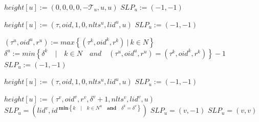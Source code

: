 \begin{algorithm}
	\caption{$ELECTSELF$}
	\begin{algorithmic}[1]
		\State $height[u] := (0,0,0,0,-\mathcal{T}_u ,u,u)$
		\State $SLP_u := (-1, -1)$
	\end{algorithmic}
\end{algorithm}

\begin{algorithm}
	\caption{$REFLECTREFLEVEL$}
	\begin{algorithmic}[1]
		\State $height[u] := (\tau, oid, 1, 0, nlts^u ,lid^u ,u)$
		\State $SLP_u := (-1, -1)$
	\end{algorithmic}
\end{algorithm}
\begin{algorithm}[h!]
	\caption{$PROPAGATELARGESTREFLEVEL$}
	\begin{algorithmic}[1]
		\State $ (\tau^u , oid^{u}, r^{u}) := max\left\lbrace (\tau ^{k},oid^{k},r^{k})~\vert~k\in N\right\rbrace  $
		\State $ \delta ^{u} := min \left\lbrace \delta ^{k} \quad \vert \quad k \in N \quad and \quad (\tau ^{u} , oid^{u}, r^{u}) = (\tau ^{k},oid^{k},r^{k})\right\rbrace - 1 $
		\State $SLP_u := (-1,-1)$
	\end{algorithmic}
\end{algorithm}
\begin{algorithm}
	\caption{$STARTNEWREFLEVEL$}
	\begin{algorithmic}[1]
		\State $ height[u] := (\tau ,oid,1,0,nlts^{u},lid^u,u) $
		\State $SLP_u := (-1,-1)$
	\end{algorithmic}
\end{algorithm}

\begin{algorithm}
	\caption{$ADOPTLPIFPRIORITY(v)$}
	\begin{algorithmic}[1]
		\State $ height[u] := (\tau ^{v} ,oid^{v},r^{v},\delta ^{v}+1,nlts^{v},lid^v,u) $
		\State $ SLP_u = (lid^v, id^{~\textbf{min} \left\lbrace k \quad \vert \quad k\in N^u \quad \textbf{and} \quad \delta^k = \delta^v \right\rbrace  })$
		\State $SLP_u = (v, -1)$
		\Else
		\State $SLP_u = (v, v)$
		\EndIf
		\EndIf
		
	\end{algorithmic}
\end{algorithm}

